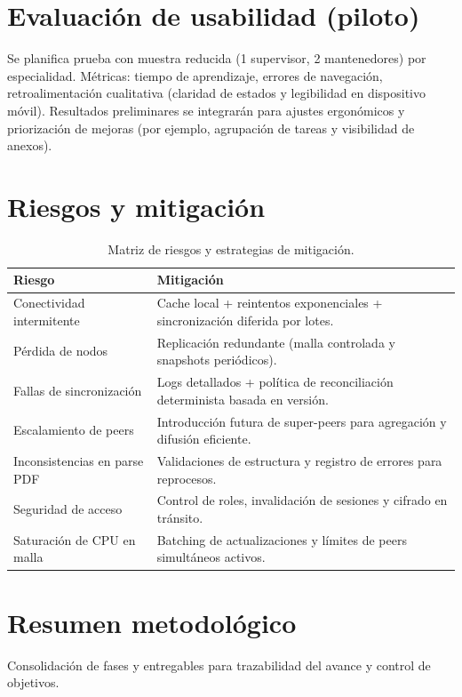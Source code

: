 \documentclass[10pt,a4paper]{report}
\begin{document}
\section*{Evaluación de usabilidad (piloto)}

Se planifica prueba con muestra reducida (1 supervisor, 2 mantenedores) por especialidad. Métricas: tiempo de aprendizaje, errores de navegación, retroalimentación cualitativa (claridad de estados y legibilidad en dispositivo móvil). Resultados preliminares se integrarán para ajustes ergonómicos y priorización de mejoras (por ejemplo, agrupación de tareas y visibilidad de anexos).

\section*{Riesgos y mitigación}
\begin{table}[H]
    \centering
    \begin{tabular}{p{4cm} p{8.5cm}}
    \hline
    \textbf{Riesgo} & \textbf{Mitigación} \\
    \hline
        Conectividad intermitente & Cache local + reintentos exponenciales + sincronización diferida por lotes. \\
        Pérdida de nodos & Replicación redundante (malla controlada y snapshots periódicos). \\
        Fallas de sincronización & Logs detallados + política de reconciliación determinista basada en versión. \\
        Escalamiento de peers & Introducción futura de super-peers para agregación y difusión eficiente. \\
        Inconsistencias en parse PDF & Validaciones de estructura y registro de errores para reprocesos. \\
        Seguridad de acceso & Control de roles, invalidación de sesiones y cifrado en tránsito. \\
        Saturación de CPU en malla & Batching de actualizaciones y límites de peers simultáneos activos. \\
        \hline
    \end{tabular}
    \caption{Matriz de riesgos y estrategias de mitigación.}
    \label{tab:riesgos}
\end{table}

\section*{Resumen metodológico}
Consolidación de fases y entregables para trazabilidad del avance y control de objetivos.
\end{document}
